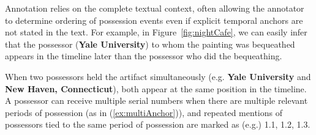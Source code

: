Annotation relies on the complete textual context, often allowing the annotator to determine ordering of possession events even if explicit temporal anchors are not stated in the text. 
For example, in Figure~\ref{fig:nightCafe}, we can easily infer that the possessor (\textbf{Yale University}) to whom the painting was bequeathed appears in the timeline later than the possessor who did the bequeathing.

When two possessors held the artifact simultaneously (e.g. \textbf{Yale University} and \textbf{New Haven, Connecticut}), both appear at the same position in the timeline. 
A possessor can receive multiple serial numbers when there are multiple relevant periods of possession (as in (\ref{ex:multiAnchor})), and repeated mentions of possessors tied to the same period of possession are marked as (e.g.) 1.1, 1.2, 1.3.






